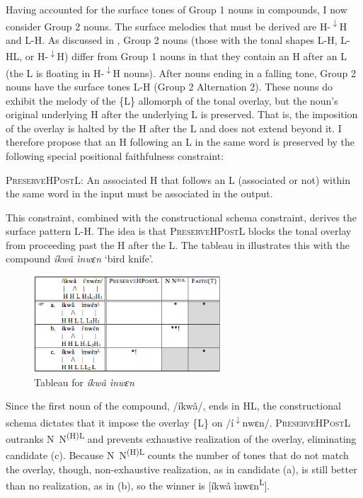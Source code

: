 \documentclass[output=paper]{langscibook}
\begin{document}
Having accounted for the surface tones of Group 1 nouns in compounds, I now consider Group 2 nouns. The surface melodies that must be derived are H-\textsuperscript{$\downarrow$}H and L-H. As discussed in , Group 2 nouns (those with the tonal shapes L-H, L-HL, or H-\textsuperscript{$\downarrow$}H) differ from Group 1 nouns in that they contain an H after an L (the L is floating in H-\textsuperscript{$\downarrow$}H nouns). After nouns ending in a falling tone, Group 2 nouns have the surface tones L-H (Group 2 Alternation 2). These nouns do exhibit the melody of the \{L\} allomorph of the tonal overlay, but the noun’s original underlying H after the underlying L is preserved. That is, the imposition of the overlay is halted by the H after the L and does not extend beyond it. I therefore propose that an H following an L in the same word is preserved by the following special positional faithfulness constraint: 

\ea \label{ex:glewwe:3}
{\textsc{PreserveHPostL:} An associated H that follows an L (associated or not) within the same word in the input must be associated in the output.} \\
\z

This constraint, combined with the constructional schema constraint, derives the surface pattern L-H. The idea is that \textsc{PreserveHPostL} blocks the tonal overlay from proceeding past the H after the L. The tableau in  illustrates this with the compound \textit{íkwâ ìnwɛn} ‘bird knife’.
  
\begin{figure}
\includegraphics[width=70mm]{figures/glewwe-img4.png}
\caption{Tableau for \textit{íkwâ ìnwɛn}}
\label{fig:glewwe:5}
\end{figure}

Since the first noun of the compound, /íkwâ/, ends in HL, the constructional schema dictates that it impose the overlay \{L\} on /í\textsuperscript{$\downarrow$}nwɛn/. \textsc{PreserveHPostL} outranks N~N\textsuperscript{(H)L} and prevents exhaustive realization of the overlay, eliminating candidate (c). Because N~N\textsuperscript{(H)L} counts the number of tones that do not match the overlay, though, non-exhaustive realization, as in candidate (a), is still better than no realization, as in (b), so the winner is [íkwâ ìnwɛn\textsuperscript{L}]. 
\end{document}
